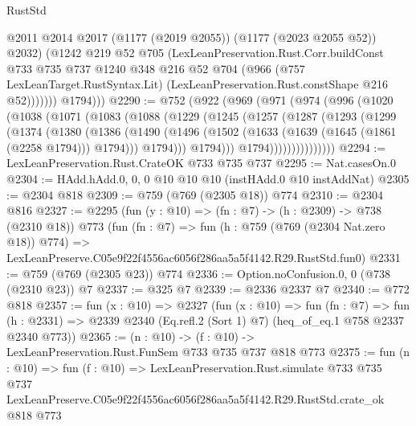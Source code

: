\begin{lexlean}{RustStd}
\begin{coremodule}
                  @2011
                  @2014
                  @2017
                  (@1177 (@2019 @2055))
                  (@1177 (@2023 @2055 @52))
                  @2032)
                (@1242
                  @219
                  @52
                  @705
                  (LexLeanPreservation.Rust.Corr.buildConst
                    @733
                    @735
                    @737
                    @1240
                    @348
                    @216
                    @52
                    @704
                    (@966
                      (@757 LexLeanTarget.RustSyntax.Lit)
                      (LexLeanPreservation.Rust.constShape @216 @52)))))))
          @1794)))
@2290 := @752
    (@922
      (@969
        (@971
          (@974
            (@996
              (@1020
                (@1038
                  (@1071
                    (@1083
                      (@1088
                        (@1229
                          (@1245
                            (@1257
                              (@1287
                                (@1293
                                  (@1299
                                    (@1374
                                      (@1380
                                        (@1386
                                          (@1490
                                            (@1496
                                              (@1502
                                                (@1633 (@1639 (@1645 (@1861 (@2258 @1794))) @1794)))
                                              @1794)))
                                        @1794)))
                                  @1794)))))))))))))))
@2294 := LexLeanPreservation.Rust.CrateOK @733 @735 @737
@2295 := Nat.casesOn.{0}
@2304 := HAdd.hAdd.{0, 0, 0} @10 @10 @10 (instHAdd.{0} @10 instAddNat)
@2305 := @2304 @818
@2309 := @759 (@769 (@2305 @18)) @774
@2310 := @2304 @816
@2327 := @2295
    (fun (y : @10) => (fn : @7) -> (h : @2309) -> @738 (@2310 @18))
    @773
    (fun (fn : @7) =>
    fun (h : @759 (@769 (@2304 Nat.zero @18)) @774) =>
    LexLeanPreserve.C05e9f22f4556ac6056f286aa5a5f4142.R29.RustStd.fun0)
@2331 := @759 (@769 (@2305 @23)) @774
@2336 := Option.noConfusion.{0, 0} (@738 (@2310 @23)) @7
@2337 := @325 @7
@2339 := @2336 @2337 @7
@2340 := @772 @818
@2357 := fun (x : @10) =>
  @2327
    (fun (x : @10) =>
    fun (fn : @7) =>
    fun (h : @2331) => @2339 @2340 (Eq.refl.{2} (Sort 1) @7) (heq_of_eq.{1} @758 @2337 @2340 @773))
@2365 := (n : @10) -> (f : @10) -> LexLeanPreservation.Rust.FunSem @733 @735 @737 @818 @773
@2375 := fun (n : @10) =>
  fun (f : @10) =>
  LexLeanPreservation.Rust.simulate
    @733
    @735
    @737
    LexLeanPreserve.C05e9f22f4556ac6056f286aa5a5f4142.R29.RustStd.crate_ok
    @818
    @773
\end{coremodule}
\end{lexlean}
